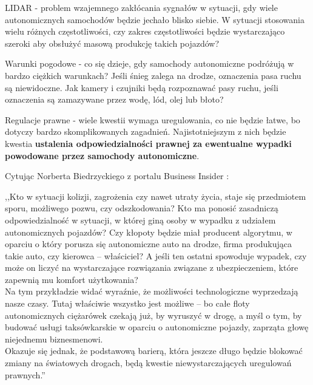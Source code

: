\begin{enumerate*}
\item LIDAR - problem wzajemnego zakłócania sygnałów w sytuacji, gdy wiele autonomicznych samochodów będzie jechało blisko siebie. W sytuacji stosowania wielu różnych częstotliwości, czy zakres częstotliwości będzie wystarczająco szeroki aby obsłużyć masową produkcję takich pojazdów?
\item Warunki pogodowe - co się dzieje, gdy samochody autonomiczne podróżują w bardzo ciężkich warunkach? Jeśli śnieg zalega na drodze, oznaczenia pasa ruchu są niewidoczne. Jak kamery i czujniki będą rozpoznawać pasy ruchu, jeśli oznaczenia są zamazywane przez wodę, lód, olej lub błoto?
\item Regulacje prawne - wiele kwestii wymaga uregulowania, co nie będzie łatwe, bo dotyczy bardzo skomplikowanych zagadnień. Najistotniejszym z nich będzie kwestia \textbf{ustalenia odpowiedzialności prawnej za ewentualne wypadki powodowane przez samochody autonomiczne}.

\newpage
Cytując Norberta Biedrzyckiego z portalu Business Insider \cite{businessInsider:autonomiczneAutaPrawo}: \\
\begin{itshape}
,,Kto w sytuacji kolizji, zagrożenia czy nawet utraty życia, staje się przedmiotem sporu, możliwego pozwu, czy odszkodowania? Kto ma ponosić zasadniczą odpowiedzialność w sytuacji, w której giną osoby w wypadku z udziałem autonomicznych pojazdów? Czy kłopoty będzie miał producent algorytmu, w oparciu o który porusza się autonomiczne auto na drodze, firma produkująca takie auto, czy kierowca – właściciel? A jeśli ten ostatni spowoduje wypadek, czy może on liczyć na wystarczające rozwiązania związane z ubezpieczeniem, które zapewnią mu komfort użytkowania? \\

Na tym przykładzie widać wyraźnie, że możliwości technologiczne wyprzedzają nasze czasy. Tutaj właściwie wszystko jest możliwe – bo całe floty autonomicznych ciężarówek czekają już, by wyruszyć w drogę, a myśl o tym, by budować usługi taksówkarskie w oparciu o autonomiczne pojazdy, zaprząta głowę niejednemu biznesmenowi. \\

Okazuje się jednak, że podstawową barierą, która jeszcze długo będzie blokować zmiany na światowych drogach, będą kwestie niewystarczających uregulowań prawnych.''
\end{itshape}
\end{enumerate*}

